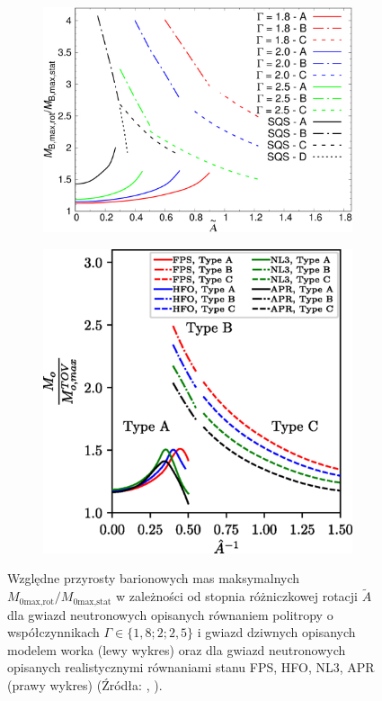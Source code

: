 \documentclass{bachelor_thesis}
\begin{document}
        \begin{figure}[h!]
            \centering
            \begin{subfigure}{.5\textwidth}
              \centering
              \includegraphics[width=.93\linewidth]{figures/RysSzk.jpg}
            \end{subfigure}%
            \begin{subfigure}{.5\textwidth}
              \centering
              \includegraphics[width=.93\linewidth]{figures/RysEsp.png}
            \end{subfigure}
            \caption{Względne przyrosty barionowych mas maksymalnych $M_{0\textrm{max,rot}}/M_{0\textrm{max,stat}}$ w zależności od stopnia różniczkowej rotacji $\tilde{A}$ dla gwiazd neutronowych opisanych równaniem politropy o współczynnikach $\Gamma\in\{1,8;2;2,5\}$ i gwiazd dziwnych opisanych modelem worka (lewy wykres) oraz dla gwiazd neutronowych opisanych realistycznymi równaniami stanu FPS, HFO, NL3, APR (prawy wykres) (Źródła: \citealp{Szkudlarek2019}, \citealp{Espino2019}).}
            \label{RysSzkEsp}
        \end{figure}
\end{document}
